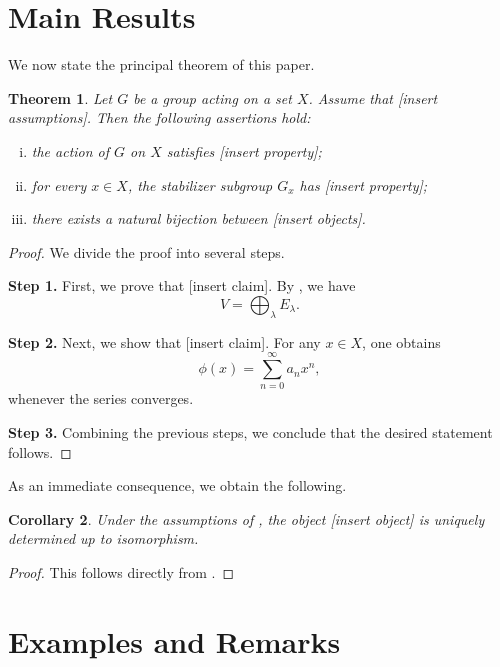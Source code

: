 \documentclass[11pt,a4paper]{article}
\theoremstyle{plain}
\newtheorem{theorem}{Theorem}[section]
\newtheorem{corollary}[theorem]{Corollary}
\theoremstyle{definition}
\begin{document}
\section{Main Results}\label{sec:main-results}

We now state the principal theorem of this paper.

\begin{theorem}\label{thm:main}
Let $G$ be a group acting on a set $X$.
Assume that [insert assumptions].
Then the following assertions hold:
\begin{enumerate}[(i)]
  \item the action of $G$ on $X$ satisfies [insert property];
  \item for every $x \in X$, the stabilizer subgroup $G_x$ has [insert property];
  \item there exists a natural bijection between [insert objects].
\end{enumerate}
\end{theorem}

\begin{proof}
We divide the proof into several steps.

\medskip
\noindent
\textbf{Step 1.}
First, we prove that [insert claim].
By , we have
\[
  V = \bigoplus_{\lambda} E_{\lambda}.
\]

\medskip
\noindent
\textbf{Step 2.}
Next, we show that [insert claim].
For any $x \in X$, one obtains
\[
  \phi(x) = \sum_{n=0}^{\infty} a_n x^n,
\]
whenever the series converges.

\medskip
\noindent
\textbf{Step 3.}
Combining the previous steps, we conclude that the desired statement follows.
\end{proof}

As an immediate consequence, we obtain the following.

\begin{corollary}
Under the assumptions of , the object [insert object]
is uniquely determined up to isomorphism.
\end{corollary}

\begin{proof}
This follows directly from .
\end{proof}

\section{Examples and Remarks}\label{sec:examples}
\end{document}
